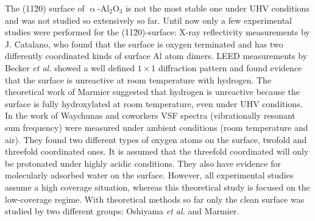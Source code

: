 \documentclass[11pt,DIV=13,BCOR=5mm,a4paper,headinclude]{scrbook}
\begin{document}
The (11\=20) surface of $\upalpha$-Al$_2$O$_3$ is not the most stable one under UHV conditions and was not studied so extensively so far.
Until now only a few experimental studies were performed for the (11\=20)-surface: X-ray reflectivity measurements by J. Catalano\cite{catalano}, who found that the surface is oxygen terminated and has two differently coordinated kinds of surface Al atom dimers.
LEED measurements by Becker \textit{et al.}\cite{Becker2002} showed a well defined $1\times 1$ diffraction pattern and found evidence that the surface is unreactive at room temperature with hydrogen.
The theoretical work of Marmier\cite{marmier} suggested that hydrogen is unreactive because the surface is fully hydroxylated at room temperature, even under UHV conditions.
In the work of Waychunas and coworkers\cite{sung} VSF spectra (vibrationally resonant sum frequency) were measured under ambient conditions (room temperature and air).
They found two different types of oxygen atoms on the surface, twofold and threefold coordinated ones.
It is assumed that the threefold coordinated will only be protonated under highly acidic conditions.
They also have evidence for molecularly adsorbed water on the surface.
However, all experimental studies\cite{catalano,sung,Becker2002} assume a high coverage situation, whereas this theoretical study is focused on the low-coverage regime.
With theoretical methods so far only the clean surface was studied by two different groups: Oshiyama \textit{et al.}\cite{kuri10} and Marmier\cite{marmier}.
\end{document}
